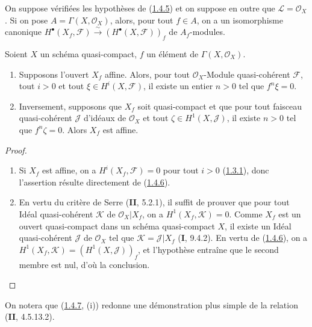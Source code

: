 \begin{corollary}[1.4.6]
\label{III.1.4.6-fr}
On suppose vérifiées les hypothèses de
\textup{(\hyperref[III.1.4.5-fr]{1.4.5})} et on suppose en outre que
$\mathcal L=\mathcal O_X$. Si on pose $A=\Gamma(X,\mathcal O_X)$, alors,
pour tout $f\in A$, on a un isomorphisme canonique
$H^\bullet(X_f,\mathcal F)
\xrightarrow{\sim}(H^\bullet(X,\mathcal F))_f$
de $A_f$-modules.
\end{corollary}

\begin{corollary}[1.4.7]
\label{III.1.4.7-fr}
Soient $X$ un schéma quasi-compact, $f$ un élément de
$\Gamma(X,\mathcal O_X)$.
\begin{enumerate}
\item[\textup{(i)}] Supposons l'ouvert $X_f$ affine. Alors, pour tout
$\mathcal O_X$-Module quasi-cohérent $\mathcal F$, tout $i>0$ et tout
$\xi\in H^i(X,\mathcal F)$, il existe un entier $n>0$ tel que $f^n\xi=0$.
\item[\textup{(ii)}] Inversement, supposons que $X_f$ soit quasi-compact et que pour
tout faisceau quasi-cohérent $\mathcal J$ d'idéaux de $\mathcal O_X$ et tout
$\zeta\in H^1(X,\mathcal J)$, il existe $n>0$ tel que $f^n\zeta=0$. Alors
$X_f$ est affine.
\end{enumerate}
\end{corollary}

\begin{proof}
\begin{enumerate}
\item[(i)] Si $X_f$ est affine, on a $H^i(X_f,\mathcal F)=0$ pour tout
$i>0$ (\hyperref[III.1.3.1-fr]{1.3.1}), donc l'assertion résulte directement
de (\hyperref[III.1.4.6-fr]{1.4.6}).
\item[(ii)] En vertu du critère de Serre (\textbf{II}, 5.2.1), il suffit de prouver
que pour tout Idéal quasi-cohérent $\mathcal K$ de
$\mathcal O_X\vert X_f$, on a $H^1(X_f,\mathcal K)=0$. Comme $X_f$ est un
ouvert quasi-compact dans un schéma quasi-compact $X$, il existe un Idéal
quasi-cohérent $\mathcal J$ de $\mathcal O_X$ tel que
$\mathcal K=\mathcal J\vert X_f$ (\textbf{I}, 9.4.2). En vertu de
(\hyperref[III.1.4.6-fr]{1.4.6}), on a
$H^1(X_f,\mathcal K)=(H^1(X,\mathcal J))_f$, et l'hypothèse entraîne que le
second membre est nul, d'où la conclusion.
\end{enumerate}
\end{proof}

\begin{remark}[1.4.8]
\label{III.1.4.8-fr}
On notera que (\hyperref[III.1.4.7-fr]{1.4.7}, (i)) redonne une
démonstration plus simple de la relation (\textbf{II}, 4.5.13.2).
\end{remark}

